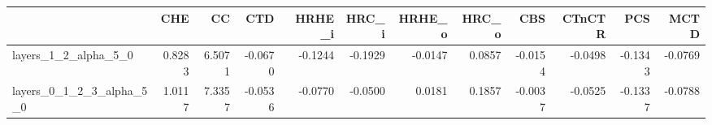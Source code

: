 \begin{tabular}{lrrrrrrrrrrr}
\toprule
 & CHE & CC & CTD & HRHE_i & HRC_i & HRHE_o & HRC_o & CBS & CTnCTR & PCS & MCTD \\
\midrule
layers_1_2_alpha_5_0 & 0.8283 & 6.5071 & -0.0670 & -0.1244 & -0.1929 & -0.0147 & 0.0857 & -0.0154 & -0.0498 & -0.1343 & -0.0769 \\
layers_0_1_2_3_alpha_5_0 & 1.0117 & 7.3357 & -0.0536 & -0.0770 & -0.0500 & 0.0181 & 0.1857 & -0.0037 & -0.0525 & -0.1337 & -0.0788 \\
\bottomrule
\end{tabular}
